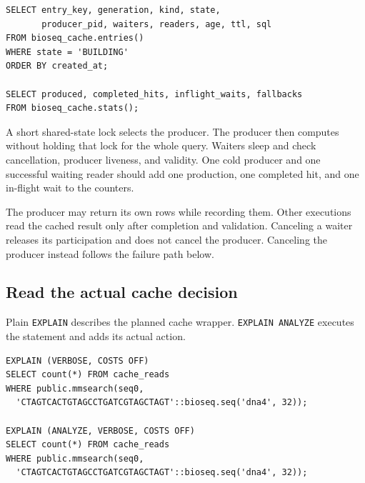 \par\noindent\begin{minipage}{\linewidth}
\begin{lstlisting}[style=bioseq-appendix-sql,
  caption={Inspect producers and waiting executions.}]
SELECT entry_key, generation, kind, state,
       producer_pid, waiters, readers, age, ttl, sql
FROM bioseq_cache.entries()
WHERE state = 'BUILDING'
ORDER BY created_at;

SELECT produced, completed_hits, inflight_waits, fallbacks
FROM bioseq_cache.stats();
\end{lstlisting}
\end{minipage}

A short shared-state lock selects the producer. The producer then computes
without holding that lock for the whole query. Waiters sleep and check
cancellation, producer liveness, and validity. One cold producer and one
successful waiting reader should add one production, one completed hit, and
one in-flight wait to the counters.

The producer may return its own rows while recording them. Other executions
read the cached result only after completion and validation. Canceling a
waiter releases its participation and does not cancel the producer. Canceling
the producer instead follows the failure path below.

\subsection{Read the actual cache decision}

Plain \texttt{EXPLAIN} describes the planned cache wrapper.
\texttt{EXPLAIN ANALYZE} executes the statement and adds its actual action.

\par\noindent\begin{minipage}{\linewidth}
\begin{lstlisting}[style=bioseq-appendix-sql,
  caption={Inspect a planned cache route, then its execution.}]
EXPLAIN (VERBOSE, COSTS OFF)
SELECT count(*) FROM cache_reads
WHERE public.mmsearch(seq0,
  'CTAGTCACTGTAGCCTGATCGTAGCTAGT'::bioseq.seq('dna4', 32));

EXPLAIN (ANALYZE, VERBOSE, COSTS OFF)
SELECT count(*) FROM cache_reads
WHERE public.mmsearch(seq0,
  'CTAGTCACTGTAGCCTGATCGTAGCTAGT'::bioseq.seq('dna4', 32));
\end{lstlisting}
\end{minipage}

